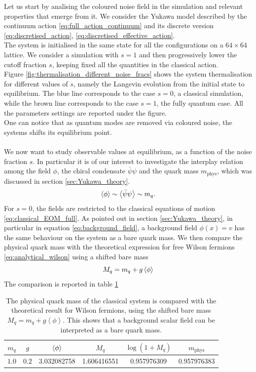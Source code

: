 Let us start by analising the coloured noise field in the simulation and relevant properties that emerge from it. We consider the Yukawa model described by the continuum action \eqref{eq:full_action_continuum} and its discrete version \eqref{eq:discretised_action}, \eqref{eq:discretised_effective_action}.\\
The system is initialised in the same state for all the configurations on a $64 \times 64$ lattice. We consider a simulation with $s=1$ and then progressively lower the cutoff fraction $s$, keeping fixed all the quantities in the classical action. \\
Figure \ref{fig:thermalisation_different_noise_fracs} shows the system thermalisation for different values of $s$, namely the Langevin evolution from the initial state to equilibrium. The blue line corresponds to the case $s=0$, a classical simulation, while the brown line corresponds to the case $s=1$, the fully quantum case.  All the parameters settings are reported under the figure. \\
One can notice that as quantum modes are removed via coloured noise, the systems shifts its equilibrium point. \\~\\ 
We now want to study observable values at equilibrium, as a function of the noise fraction $s$. In particular it is of our interest to investigate the interplay relation among the field $\phi$, the chiral condensate $\bar\psi\psi$ and the quark mass $m_\text{phys}$, which was discussed in section \ref{sec:Yukawa_theory}.
\begin{equation*}
	\left\langle \phi \right\rangle \sim \left\langle \bar\psi\psi \right\rangle \sim m_q.
\end{equation*}
For $s=0$, the fields are restricted to the classical equations of motion \eqref{eq:classical_EOM_full}. As pointed out in section \ref{sec:Yukawa_theory}, in particular in equation \eqref{eq:background_field}, a background field $\phi(x) = v$ has the same behaviour on the system as a bare quark mass. We then compare the physical quark mass with the theoretical expression for free Wilson fermions \eqref{eq:analytical_wilson} using a shifted bare mass 
\begin{equation*}
	M_q = m_q + g \left\langle \phi \right\rangle
\end{equation*}
The comparison is reported in table \ref{tab:background_field}
\begin{table}[htp]
    \centering
    \begin{tabular}{cccccc}
        \toprule
        $m_q$ & $g$ & $\left\langle \phi \right\rangle$ & $M_q$ & $\log(1+M_q)$ & $m_\text{phys}$ \\
        \midrule
	$1.0$ & $0.2$ & 3.032082758 & 1.606416551
    & 0.957976309
    & 0.957976383 \\
        \bottomrule
    \end{tabular}
    \caption[Background field and quark mass]{The physical quark mass of the classical system is compared with the theoretical result for Wilson fermions, using the shifted bare mass $M_q = m_q + g \left\langle\phi\right\rangle$. This shows that a background scalar field can be interpreted as a bare quark mass.}
    \label{tab:background_field}
\end{table}
